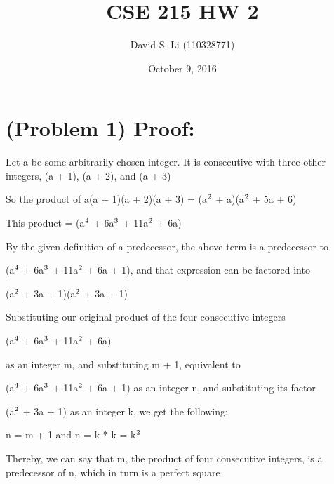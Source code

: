 \documentclass{article}
\title{CSE 215 HW 2}
\author{David S. Li (110328771)}
\date{October 9, 2016}
\begin{document}
\maketitle

\section{(Problem 1) Proof:}

Let a be some arbitrarily chosen integer.  It is consecutive with three other integers, (a + 1), (a + 2), and (a + 3)

\par\vspace{0.5cm}\noindent
So the product of a(a + 1)(a + 2)(a + 3) = (a$\textsuperscript{2}$ + a)(a$\textsuperscript{2}$ + 5a + 6)
\par\vspace{0.5cm}\noindent
This product = (a$\textsuperscript{4}$ + 6a$\textsuperscript{3}$ + 11a$\textsuperscript{2}$ + 6a)
\par\vspace{0.5cm}\noindent
By the given definition of a predecessor, the above term is a predecessor to \par\noindent(a$\textsuperscript{4}$ + 6a$\textsuperscript{3}$ + 11a$\textsuperscript{2}$ + 6a + 1), and that expression can be factored into \par\noindent
(a$\textsuperscript{2}$ + 3a + 1)(a$\textsuperscript{2}$ + 3a + 1)
\par\vspace{0.5cm}\noindent
Substituting our original product of the four consecutive integers \par\noindent (a$\textsuperscript{4}$ + 6a$\textsuperscript{3}$ + 11a$\textsuperscript{2}$ + 6a) \par\noindent as an integer m, and substituting m + 1, equivalent to \par\noindent
(a$\textsuperscript{4}$ + 6a$\textsuperscript{3}$ + 11a$\textsuperscript{2}$ + 6a + 1) as an integer n, and substituting its factor \par\noindent (a$\textsuperscript{2}$ + 3a + 1) as an integer k, we get the following: \par\vspace{0.5cm}\noindent
n = m + 1 and n = k * k = k$\textsuperscript{2}$ \par\vspace{0.5cm}\noindent
Thereby, we can say that m, the product of four consecutive integers, is a predecessor of n, which in turn is a perfect square
\end{document}
